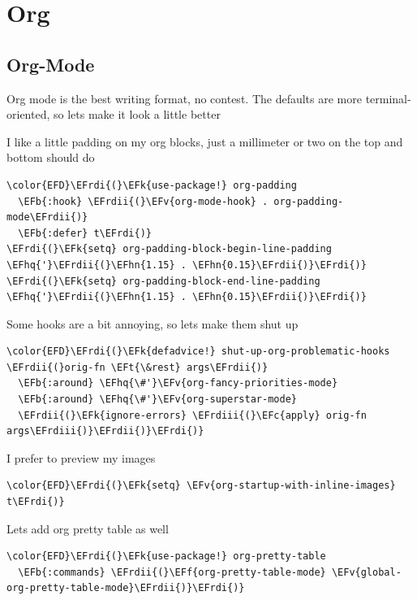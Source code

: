 \documentclass{scrartcl}
\newcommand{\EFk}[1]{\textcolor{EFk}{#1}} %
\newcommand{\EFt}[1]{\textcolor{EFt}{#1}} %
\newcommand{\EFb}[1]{\textcolor{EFb}{#1}} %
\newcommand{\EFc}[1]{\textcolor{EFc}{#1}} %
\newcommand{\EFv}[1]{\textcolor{EFv}{#1}} %
\newcommand{\EFf}[1]{\textcolor{EFf}{#1}} %
\newcommand{\EFhn}[1]{\textcolor{EFhn}{\textbf{#1}}} %
\newcommand{\EFhq}[1]{\textcolor{EFhq}{#1}} %
\newcommand{\EFrdi}[1]{\textcolor{EFrdi}{#1}} %
\newcommand{\EFrdii}[1]{\textcolor{EFrdii}{#1}} %
\newcommand{\EFrdiii}[1]{\textcolor{EFrdiii}{#1}} %
\begin{document}
\section{Org}
\label{sec:org34f5a61}
\subsection{Org-Mode}
\label{sec:org7bb352a}
Org mode is the best writing format, no contest. The defaults are more
terminal-oriented, so lets make it look a little better

I like a little padding on my org blocks, just a millimeter or two on the top and bottom should do
\begin{Code}
\begin{Verbatim}[]
\color{EFD}\EFrdi{(}\EFk{use-package!} org-padding
  \EFb{:hook} \EFrdii{(}\EFv{org-mode-hook} . org-padding-mode\EFrdii{)}
  \EFb{:defer} t\EFrdi{)}
\EFrdi{(}\EFk{setq} org-padding-block-begin-line-padding \EFhq{'}\EFrdii{(}\EFhn{1.15} . \EFhn{0.15}\EFrdii{)}\EFrdi{)}
\EFrdi{(}\EFk{setq} org-padding-block-end-line-padding \EFhq{'}\EFrdii{(}\EFhn{1.15} . \EFhn{0.15}\EFrdii{)}\EFrdi{)}
\end{Verbatim}
\end{Code}

Some hooks are a bit annoying, so lets make them shut up
\begin{Code}
\begin{Verbatim}[]
\color{EFD}\EFrdi{(}\EFk{defadvice!} shut-up-org-problematic-hooks \EFrdii{(}orig-fn \EFt{\&rest} args\EFrdii{)}
  \EFb{:around} \EFhq{\#'}\EFv{org-fancy-priorities-mode}
  \EFb{:around} \EFhq{\#'}\EFv{org-superstar-mode}
  \EFrdii{(}\EFk{ignore-errors} \EFrdiii{(}\EFc{apply} orig-fn args\EFrdiii{)}\EFrdii{)}\EFrdi{)}
\end{Verbatim}
\end{Code}

I prefer to preview my images
\begin{Code}
\begin{Verbatim}[]
\color{EFD}\EFrdi{(}\EFk{setq} \EFv{org-startup-with-inline-images} t\EFrdi{)}
\end{Verbatim}
\end{Code}

Lets add org pretty table as well
\begin{Code}
\begin{Verbatim}[]
\color{EFD}\EFrdi{(}\EFk{use-package!} org-pretty-table
  \EFb{:commands} \EFrdii{(}\EFf{org-pretty-table-mode} \EFv{global-org-pretty-table-mode}\EFrdii{)}\EFrdi{)}
\end{Verbatim}
\end{Code}
\end{document}
